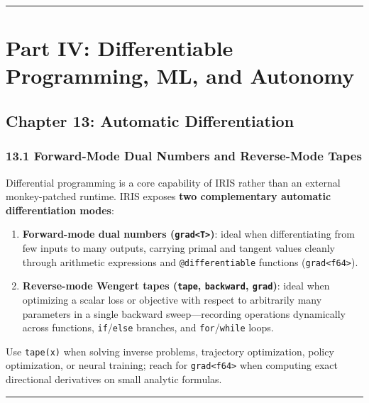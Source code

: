 \documentclass[
  english,
  oneside]{book}
\providecommand{\tightlist}{%
  \setlength{\itemsep}{0pt}\setlength{\parskip}{0pt}}
\begin{document}
\begin{center}\rule{0.5\linewidth}{0.5pt}\end{center}

\part{Part IV: Differentiable Programming, ML, and
Autonomy}\label{part-iv-differentiable-programming-ml-and-autonomy}

\chapter{Chapter 13: Automatic
Differentiation}\label{chapter-13-automatic-differentiation}

\section{13.1 Forward-Mode Dual Numbers and Reverse-Mode
Tapes}\label{forward-mode-dual-numbers-and-reverse-mode-tapes}

Differential programming is a core capability of IRIS rather than an
external monkey-patched runtime. IRIS exposes \textbf{two complementary
automatic differentiation modes}:

\begin{enumerate}
\def\labelenumi{\arabic{enumi}.}
\tightlist
\item
  \textbf{Forward-mode dual numbers
  (\texttt{grad\textless{}T\textgreater{}})}: ideal when differentiating
  from few inputs to many outputs, carrying primal and tangent values
  cleanly through arithmetic expressions and \texttt{@differentiable}
  functions (\texttt{grad\textless{}f64\textgreater{}}).
\item
  \textbf{Reverse-mode Wengert tapes (\texttt{tape}, \texttt{backward},
  \texttt{grad})}: ideal when optimizing a scalar loss or objective with
  respect to arbitrarily many parameters in a single backward
  sweep---recording operations dynamically across functions,
  \texttt{if}/\texttt{else} branches, and \texttt{for}/\texttt{while}
  loops.
\end{enumerate}

Use \texttt{tape(x)} when solving inverse problems, trajectory
optimization, policy optimization, or neural training; reach for
\texttt{grad\textless{}f64\textgreater{}} when computing exact
directional derivatives on small analytic formulas.

\begin{center}\rule{0.5\linewidth}{0.5pt}\end{center}
\end{document}
